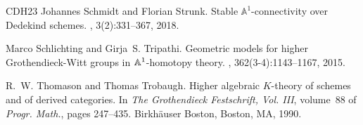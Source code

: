 \documentclass[10pt,twoside,a4paper,reqno]{amsart}
\theoremstyle{definition}
\numberwithin{equation}{section}
\renewcommand{\|}{\operatorname{|}}
\begin{document}
\begin{thebibliography}{CDH{\etalchar{+}}23}
Johannes Schmidt and Florian Strunk.
\newblock Stable {{\(\mathbb A^1\)}}-connectivity over {Dedekind} schemes.
, 3(2):331--367, 2018.

Marco Schlichting and Girja~S. Tripathi.
\newblock Geometric models for higher {G}rothendieck-{W}itt groups in
  {$\Bbb{A}^1$}-homotopy theory.
, 362(3-4):1143--1167, 2015.

R.~W. Thomason and Thomas Trobaugh.
\newblock Higher algebraic {$K$}-theory of schemes and of derived categories.
\newblock In {\em The {G}rothendieck {F}estschrift, {V}ol. {III}}, volume~88 of
  {\em Progr. Math.}, pages 247--435. Birkh\"{a}user Boston, Boston, MA, 1990.

\end{thebibliography}
\end{document}
